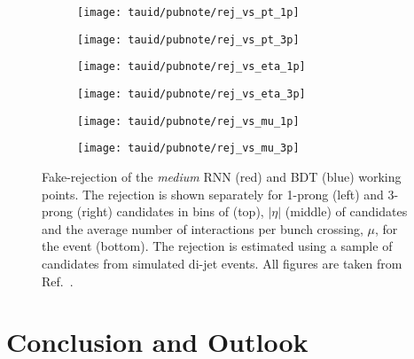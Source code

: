 \begin{figure}[htbp]

  \begin{subfigure}{0.498\textwidth}
    \texttt{[image: tauid/pubnote/rej\_vs\_pt\_1p]}
    \subcaption{}%
    \label{fig:tauid_faketau_rej_a}
  \end{subfigure}\hfill%
  \begin{subfigure}{0.498\textwidth}
    \texttt{[image: tauid/pubnote/rej\_vs\_pt\_3p]}
    \subcaption{}%
    \label{fig:tauid_faketau_rej_b}
  \end{subfigure}

  \begin{subfigure}{0.498\textwidth}
    \texttt{[image: tauid/pubnote/rej\_vs\_eta\_1p]}
    \subcaption{}
  \end{subfigure}\hfill%
  \begin{subfigure}{0.498\textwidth}
    \texttt{[image: tauid/pubnote/rej\_vs\_eta\_3p]}
    \subcaption{}
  \end{subfigure}

  \begin{subfigure}{0.498\textwidth}
    \texttt{[image: tauid/pubnote/rej\_vs\_mu\_1p]}
    \subcaption{}%
    \label{fig:tauid_faketau_rej_e}
  \end{subfigure}\hfill%
  \begin{subfigure}{0.498\textwidth}
    \texttt{[image: tauid/pubnote/rej\_vs\_mu\_3p]}
    \subcaption{}%
    \label{fig:tauid_faketau_rej_f}
  \end{subfigure}

  \caption{Fake-\tauhadvis rejection of the \emph{medium} RNN (red)
    and BDT (blue) \tauid working points. The rejection is shown
    separately for 1-prong (left) and 3-prong (right) \tauhadvis
    candidates in bins of \pT (top), $|\eta|$ (middle) of \tauhadvis
    candidates and the average number of interactions per bunch
    crossing, $\mu$, for the event (bottom). The rejection is
    estimated using a sample of \tauhadvis candidates from simulated
    di-jet events. All figures are taken from
    Ref.~\cite{ATL-PHYS-PUB-2019-033}.}%
  \label{fig:tauid_faketau_rej}
\end{figure}


\section{Conclusion and Outlook}%
\label{sec:tauid_conclusion}

